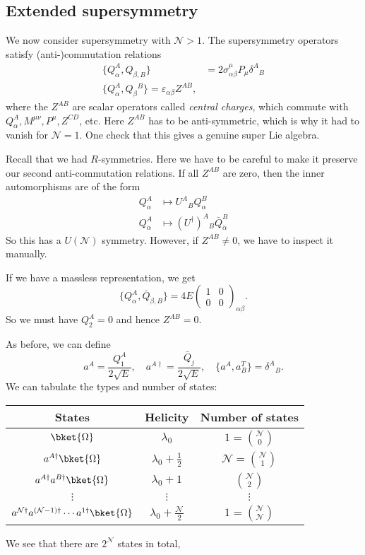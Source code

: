 \documentclass[a4paper]{article}
\begin{document}
\subsection{Extended supersymmetry}
We now consider supersymmetry with $\mathcal{N} > 1$. The supersymmetry operators satisfy (anti-)commutation relations
\begin{align*}
  \{Q_\alpha^A, Q_{\dot{\beta}, B}\} &= 2 \sigma^\mu_{\alpha\beta} P_\mu \delta^A\!_B\\
  \{Q_\alpha^A, Q_\beta\!^B\} = \varepsilon_{\alpha\beta} Z^{AB},
\end{align*}
where the $Z^{AB}$ are scalar operators called \emph{central charges}, which commute with $Q^A_\alpha, M^{\mu\nu}, P^\mu, Z^{CD}$, etc. Here $Z^{AB}$ has to be anti-symmetric, which is why it had to vanish for $\mathcal{N} = 1$. One check that this gives a genuine super Lie algebra.

Recall that we had $R$-symmetries. Here we have to be careful to make it preserve our second anti-commutation relations. If all $Z^{AB}$ are zero, then the inner automorphisms are of the form
\begin{align*}
  Q_\alpha^A &\mapsto U^A\!_B Q_\alpha^B\\
  Q_{\dot{\alpha}}^A &\mapsto (U^\dagger)^A\!_B \bar{Q}_{\dot{\alpha}}^B
\end{align*}
So this has a $U(\mathcal{N})$ symmetry. However, if $Z^{AB} \not= 0$, we have to inspect it manually.

If we have a massless representation, we get
\[
  \{Q_\alpha^A, \bar{Q}_{\dot{\beta}, B}\} = 4E
  \begin{pmatrix}
    1 & 0\\
    0 & 0
  \end{pmatrix}_{\alpha\beta}.
\]
So we must have $Q_2^A = 0$ and hence $Z^{AB} = 0$.

As before, we can define
\[
  a^A = \frac{Q_1^A}{2\sqrt{E}},\quad a^{A\dagger} = \frac{\bar{Q}_j}{2 \sqrt{E}},\quad\{a^A, a_B^T\} = \delta^A\!_B.
\]
We can tabulate the types and number of states:
\begin{tabular}{ccc}
  \toprule
  States & Helicity & Number of states\\
  \midrule
  $\bket{\Omega}$ & $\lambda_0$ & $1 = \binom{\mathcal{N}}{0}$\\
  $a^{A\dagger} \bket{\Omega}$ & $\lambda_0 + \frac{1}{2}$ & $\mathcal{N} = \binom{\mathcal{N}}{1}$\\
  $a^{A\dagger} a^{B\dagger} \bket{\Omega}$ & $\lambda_0 + 1$ & $\binom{\mathcal{N}}{2}$\\
  $\vdots$ & $\vdots$ & $\vdots$ \\
  $a^{\mathcal{N}\dagger} a^{(\mathcal{N} - 1)\dagger} \cdots a^{1\dagger} \bket{\Omega}$ & $\lambda_0 + \frac{\mathcal{N}}{2}$ & $1 = \binom{\mathcal{N}}{\mathcal{N}}$\\
  \bottomrule
\end{tabular}
We see that there are $2^{\mathcal{N}}$ states in total,
\end{document}
